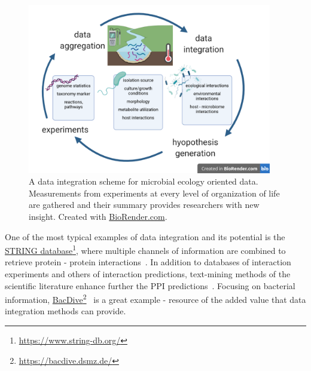       \begin{figure}[!h]
         \centering
         \includegraphics[width=0.95\textwidth]{figures/data_integration_scheme.png}
         \caption[Data integration in Microbial Ecology]{A data integration scheme for microbial ecology oriented data. 
         Measurements from experiments at every level of organization of life are gathered and their summary provides researchers with new insight. Created with \href{BioRender.com}{BioRender.com}.
         }
         \label{fig:data_int}
      \end{figure}


      One of the most typical examples of data integration and its potential
      is the \href{https://www.string-db.org/}{STRING database}\footnote{\href{https://www.string-db.org/}{https://www.string-db.org/}}, where multiple channels of information are combined 
      to retrieve protein - protein interactions~\cite{mering2003string, szklarczyk2021string}. 
      In addition to databases of interaction experiments and others of interaction predictions, text-mining methods of the scientific literature enhance further the 
      PPI predictions~\cite{szklarczyk2021string}.
      Focusing on bacterial information, \href{https://bacdive.dsmz.de/}{BacDive}\footnote{\href{https://bacdive.dsmz.de/}{https://bacdive.dsmz.de/}}~\cite{reimer2019bac}
      is a great example - resource of the added value that data integration methods can provide. 

